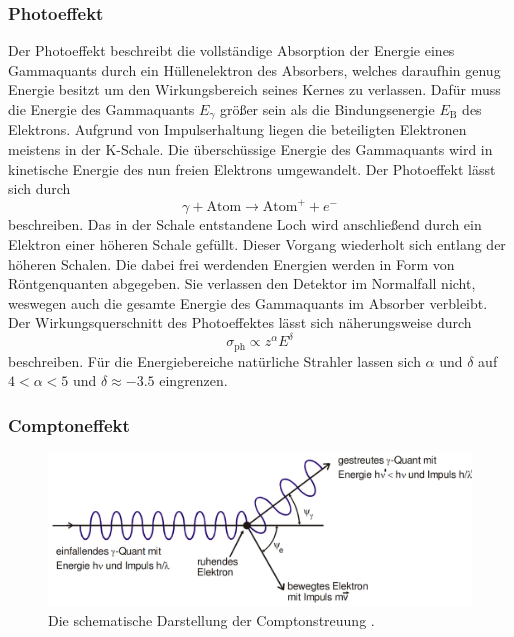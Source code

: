 \subsubsection{Photoeffekt}
Der Photoeffekt beschreibt die vollständige Absorption der Energie eines Gammaquants durch ein Hüllenelektron des Absorbers, welches daraufhin genug Energie besitzt um den Wirkungsbereich seines Kernes zu verlassen. Dafür muss die Energie des Gammaquants $E_\gamma$ größer sein als die Bindungsenergie $E_\text{B}$ des Elektrons. Aufgrund von Impulserhaltung liegen die beteiligten Elektronen meistens in der K-Schale. Die überschüssige Energie des Gammaquants wird in kinetische Energie des nun freien Elektrons umgewandelt. Der Photoeffekt lässt sich durch 
\begin{equation}
    \gamma + \text{Atom} \to \text{Atom}^+ + e^-
\end{equation}
beschreiben. Das in der Schale entstandene Loch wird anschließend durch ein Elektron einer höheren Schale gefüllt. Dieser Vorgang wiederholt sich entlang der höheren Schalen.
Die dabei frei werdenden Energien werden in Form von Röntgenquanten abgegeben. Sie verlassen den Detektor im Normalfall nicht, weswegen auch die gesamte Energie des Gammaquants im Absorber verbleibt.
Der Wirkungsquerschnitt des Photoeffektes lässt sich näherungsweise durch
\begin{equation}
    \sigma_\text{ph} \propto z^\alpha E^\delta \label{eq:sigp}
\end{equation}
beschreiben. Für die Energiebereiche natürliche Strahler lassen sich $\alpha$ und $\delta$ auf $4 < \alpha <5 $ und $\delta \approx -3.5$ eingrenzen. 

\subsubsection{Comptoneffekt}

\begin{figure}
	\centering
	\includegraphics[width=\linewidth-100pt,height=\textheight-100pt,keepaspectratio]{content/Images/compton.png}
    \caption{Die schematische Darstellung der Comptonstreuung  \cite{V18}.}
    \label{fig:compton}
\end{figure}

